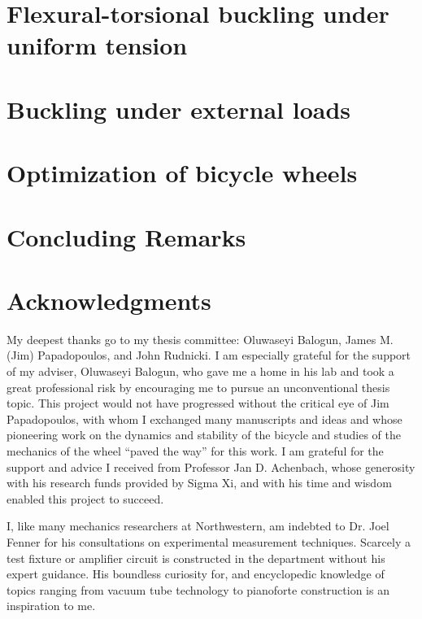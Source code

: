 \documentclass{nuthesis}
\begin{document}
\chapter{Flexural-torsional buckling under uniform tension}
\label{chap:tension_buckling}



\chapter{Buckling under external loads}
\label{chap:buckling_ext_loads}



\chapter{Optimization of bicycle wheels}
\label{chap:optimization}



\chapter*{Concluding Remarks}
\label{chap:conclusion}



\chapter*{Acknowledgments}

My deepest thanks go to my thesis committee: Oluwaseyi Balogun, James M. (Jim) Papadopoulos, and John Rudnicki. I am especially grateful for the support of my adviser, Oluwaseyi Balogun, who gave me a home in his lab and took a great professional risk by encouraging me to pursue an unconventional thesis topic. This project would not have progressed without the critical eye of Jim Papadopoulos, with whom I exchanged many manuscripts and ideas and whose pioneering work on the dynamics and stability of the bicycle and studies of the mechanics of the wheel ``paved the way'' for this work. I am grateful for the support and advice I received from Professor Jan D. Achenbach, whose generosity with his research funds provided by Sigma Xi, and with his time and wisdom enabled this project to succeed.

I, like many mechanics researchers at Northwestern, am indebted to Dr. Joel Fenner for his consultations on experimental measurement techniques. Scarcely a test fixture or amplifier circuit is constructed in the department without his expert guidance. His boundless curiosity for, and encyclopedic knowledge of topics ranging from vacuum tube technology to pianoforte construction is an inspiration to me.
\end{document}
